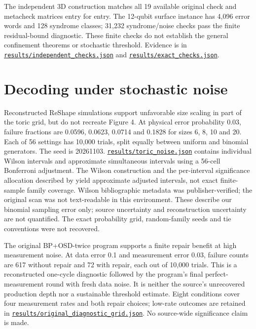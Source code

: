 \documentclass[11pt]{article}
\begin{document}
The independent 3D construction matches all 19 available original check and metacheck matrices entry for entry. The 12-qubit surface instance has 4,096 error words and 128 syndrome classes; 31,232 syndrome/noise checks pass the finite residual-bound diagnostic. These finite checks do not establish the general confinement theorems or stochastic threshold. Evidence is in \href{https://github.com/alectionary/vibe-math/blob/master/formalization/quintavalle-hgp/results/independent_checks.json}{\nolinkurl{results/independent_checks.json}} and \href{https://github.com/alectionary/vibe-math/blob/master/formalization/quintavalle-hgp/results/exact_checks.json}{\nolinkurl{results/exact_checks.json}}.

\section{Decoding under stochastic noise}
Reconstructed ReShape simulations support unfavorable size scaling in part of the toric grid, but do not recreate Figure 4. At physical error probability 0.03, failure fractions are 0.0596, 0.0623, 0.0714 and 0.1828 for sizes 6, 8, 10 and 20. Each of 56 settings has 10,000 trials, split equally between uniform and binomial generators. The seed is 20261103. \href{https://github.com/alectionary/vibe-math/blob/master/formalization/quintavalle-hgp/results/toric_noise.json}{\nolinkurl{results/toric_noise.json}} contains individual Wilson intervals and approximate simultaneous intervals using a 56-cell Bonferroni adjustment. The Wilson construction \citep{wilson1927} and the per-interval significance allocation described by \citet{nistbonferroni} yield approximate adjusted intervals, not exact finite-sample family coverage. Wilson bibliographic metadata was publisher-verified; the original scan was not text-readable in this environment. These describe our binomial sampling error only; source uncertainty and reconstruction uncertainty are not quantified. The exact probability grid, random-family seeds and tie conventions were not recovered.

The original BP+OSD-twice program supports a finite repair benefit at high measurement noise. At data error 0.1 and measurement error 0.03, failure counts are 617 without repair and 72 with repair, each out of 10,000 trials. This is a reconstructed one-cycle diagnostic followed by the program's final perfect-measurement round with fresh data noise. It is neither the source's unrecovered production depth nor a sustainable threshold estimate. Eight conditions cover four measurement rates and both repair choices; low-rate outcomes are retained in \href{https://github.com/alectionary/vibe-math/blob/master/formalization/quintavalle-hgp/results/original_diagnostic_grid.json}{\nolinkurl{results/original_diagnostic_grid.json}}. No source-wide significance claim is made.
\end{document}
